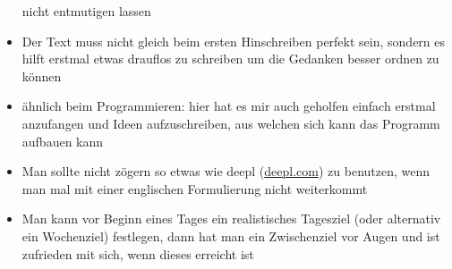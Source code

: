 \documentclass[
  letterpaper,
]{scrbook}
\begin{document}
\begin{tcolorbox}
\begin{itemize}
  nicht entmutigen lassen
\item
  Der Text muss nicht gleich beim ersten Hinschreiben perfekt sein,
  sondern es hilft erstmal etwas drauflos zu schreiben um die Gedanken
  besser ordnen zu können
\item
  ähnlich beim Programmieren: hier hat es mir auch geholfen einfach
  erstmal anzufangen und Ideen aufzuschreiben, aus welchen sich kann das
  Programm aufbauen kann
\item
  Man sollte nicht zögern so etwas wie deepl
  (\href{www.deepl.com}{deepl.com}) zu benutzen, wenn man mal mit einer
  englischen Formulierung nicht weiterkommt
\item
  Man kann vor Beginn eines Tages ein realistisches Tagesziel (oder
  alternativ ein Wochenziel) festlegen, dann hat man ein Zwischenziel
  vor Augen und ist zufrieden mit sich, wenn dieses erreicht ist
\end{itemize}

\end{tcolorbox}
\end{document}
